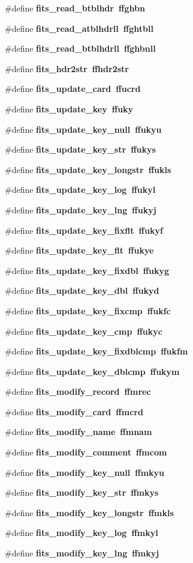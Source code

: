 \begin{CompactItemize}
\#define \bf{fits\_\-read\_\-btblhdr}~ffghbn
\item 
\#define \bf{fits\_\-read\_\-atblhdrll}~ffghtbll
\item 
\#define \bf{fits\_\-read\_\-btblhdrll}~ffghbnll
\item 
\#define \bf{fits\_\-hdr2str}~ffhdr2str
\item 
\#define \bf{fits\_\-update\_\-card}~ffucrd
\item 
\#define \bf{fits\_\-update\_\-key}~ffuky
\item 
\#define \bf{fits\_\-update\_\-key\_\-null}~ffukyu
\item 
\#define \bf{fits\_\-update\_\-key\_\-str}~ffukys
\item 
\#define \bf{fits\_\-update\_\-key\_\-longstr}~ffukls
\item 
\#define \bf{fits\_\-update\_\-key\_\-log}~ffukyl
\item 
\#define \bf{fits\_\-update\_\-key\_\-lng}~ffukyj
\item 
\#define \bf{fits\_\-update\_\-key\_\-fixflt}~ffukyf
\item 
\#define \bf{fits\_\-update\_\-key\_\-flt}~ffukye
\item 
\#define \bf{fits\_\-update\_\-key\_\-fixdbl}~ffukyg
\item 
\#define \bf{fits\_\-update\_\-key\_\-dbl}~ffukyd
\item 
\#define \bf{fits\_\-update\_\-key\_\-fixcmp}~ffukfc
\item 
\#define \bf{fits\_\-update\_\-key\_\-cmp}~ffukyc
\item 
\#define \bf{fits\_\-update\_\-key\_\-fixdblcmp}~ffukfm
\item 
\#define \bf{fits\_\-update\_\-key\_\-dblcmp}~ffukym
\item 
\#define \bf{fits\_\-modify\_\-record}~ffmrec
\item 
\#define \bf{fits\_\-modify\_\-card}~ffmcrd
\item 
\#define \bf{fits\_\-modify\_\-name}~ffmnam
\item 
\#define \bf{fits\_\-modify\_\-comment}~ffmcom
\item 
\#define \bf{fits\_\-modify\_\-key\_\-null}~ffmkyu
\item 
\#define \bf{fits\_\-modify\_\-key\_\-str}~ffmkys
\item 
\#define \bf{fits\_\-modify\_\-key\_\-longstr}~ffmkls
\item 
\#define \bf{fits\_\-modify\_\-key\_\-log}~ffmkyl
\item 
\#define \bf{fits\_\-modify\_\-key\_\-lng}~ffmkyj

\end{CompactItemize}
